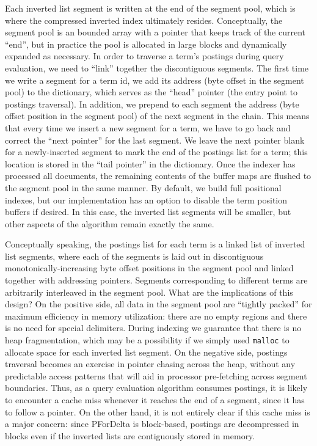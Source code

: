 Each inverted list segment is written at the end of the segment pool, which is where the compressed inverted index ultimately resides. Conceptually, the segment pool is an bounded array with a pointer that keeps track of the current ``end'', but in practice the pool is allocated in large blocks and dynamically expanded as necessary. In order to traverse a term's postings during query evaluation, we need to ``link'' together the discontiguous segments. The first time we write a segment for a term id, we add its address (byte offset in the segment pool) to the dictionary, which serves as the ``head'' pointer (the entry point to postings traversal). In addition, we prepend to each segment the address (byte offset position in the segment pool) of the next segment in the chain. This means that every time we insert a new segment for a term, we have to go back and correct the ``next pointer'' for the last segment. We leave the next pointer blank for a newly-inserted segment to mark the end of the postings list for 
a term; this location is stored in the ``tail pointer'' in the dictionary. Once the indexer has processed all documents, the remaining contents of the buffer maps are flushed to the segment pool in the same manner. By default, we build full positional indexes, but our implementation has an option to disable the term position buffers if desired. In this case, the inverted list segments will be smaller, but other aspects of the algorithm remain exactly the same.

Conceptually speaking, the postings list for each term is a linked list of inverted list segments, where each of the segments is laid out in discontiguous monotonically-increasing byte offset positions in the segment pool and linked together with addressing pointers. Segments corresponding to different terms are arbitrarily interleaved in the segment pool. What are the implications of this design? On the positive side, all data in the segment pool are ``tightly packed'' for maximum efficiency in memory utilization: there are no empty regions and there is no need for special delimiters. During indexing we guarantee that there is no heap fragmentation, which may be a possibility if we simply used \texttt{malloc} to allocate space for each inverted list segment. On the negative side, postings traversal becomes an exercise in pointer chasing across the heap, without any predictable access patterns that will aid in processor pre-fetching across segment boundaries. Thus, as a query evaluation algorithm consumes 
postings, it is likely to encounter a cache miss whenever it reaches the end of a segment, since it has to follow a pointer. On the other hand, it is not entirely clear if this cache miss is a major concern: since PForDelta is block-based, postings are decompressed in blocks even if the inverted lists are contiguously stored in memory.

